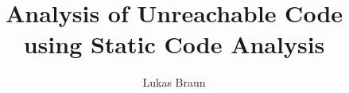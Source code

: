 \documentclass[master,english,smartquotes]{hgbthesis}
\title{Analysis of Unreachable Code using Static Code Analysis}
\author{Lukas Braun}
\begin{document}

\frontmatter                    %

\maketitle
\tableofcontents




\mainmatter          %










\appendix                                            %


\MakeBibliography %

\end{document}
